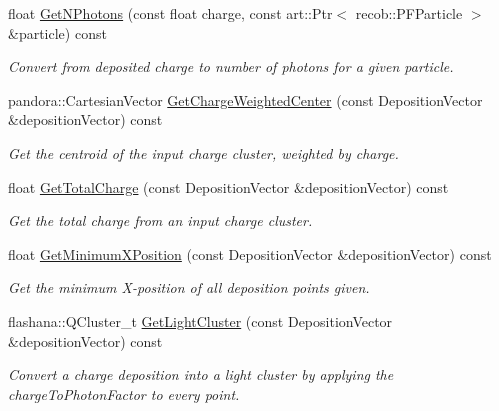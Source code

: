 \begin{DoxyCompactItemize}
\item 
float \hyperlink{classflashmatch_1_1FlashMatchingTool_1_1SliceCandidate_afb395be111f9204e915540af8075b932}{Get\+N\+Photons} (const float charge, const art\+::\+Ptr$<$ recob\+::\+P\+F\+Particle $>$ \&particle) const 
\begin{DoxyCompactList}\small\item\em Convert from deposited charge to number of photons for a given particle. \end{DoxyCompactList}\item 
pandora\+::\+Cartesian\+Vector \hyperlink{classflashmatch_1_1FlashMatchingTool_1_1SliceCandidate_ad7fc44d86307d95f09e6c0a4b9803f13}{Get\+Charge\+Weighted\+Center} (const Deposition\+Vector \&deposition\+Vector) const 
\begin{DoxyCompactList}\small\item\em Get the centroid of the input charge cluster, weighted by charge. \end{DoxyCompactList}\item 
float \hyperlink{classflashmatch_1_1FlashMatchingTool_1_1SliceCandidate_aca3c0c940b20610851ca460bb4a2f7c5}{Get\+Total\+Charge} (const Deposition\+Vector \&deposition\+Vector) const 
\begin{DoxyCompactList}\small\item\em Get the total charge from an input charge cluster. \end{DoxyCompactList}\item 
float \hyperlink{classflashmatch_1_1FlashMatchingTool_1_1SliceCandidate_a0b008482a71be1eb335c369430e1981a}{Get\+Minimum\+X\+Position} (const Deposition\+Vector \&deposition\+Vector) const 
\begin{DoxyCompactList}\small\item\em Get the minimum X-\/position of all deposition points given. \end{DoxyCompactList}\item 
flashana\+::\+Q\+Cluster\+\_\+t \hyperlink{classflashmatch_1_1FlashMatchingTool_1_1SliceCandidate_ad7c3f60dd664894ab1fb37cd4b47fdb6}{Get\+Light\+Cluster} (const Deposition\+Vector \&deposition\+Vector) const 
\begin{DoxyCompactList}\small\item\em Convert a charge deposition into a light cluster by applying the charge\+To\+Photon\+Factor to every point. \end{DoxyCompactList}\end{DoxyCompactItemize}


